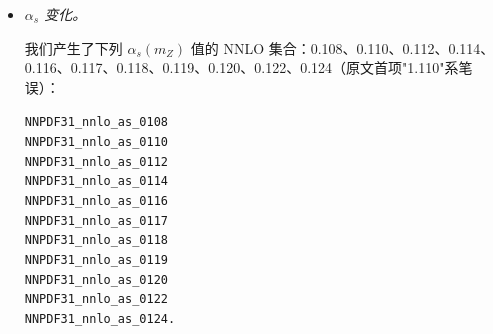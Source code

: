 \begin{itemize}
我们产生了 NLO 与 NNLO 的集合，其最大味数不同于默认的 5：或扩展至六，或冻结在四：
\begin{flushleft}
  \tt NNPDF31\_nlo\_as\_0118\_nf\_4 \\
  \tt NNPDF31\_nlo\_as\_0118\_nf\_6 \\
  \tt NNPDF31\_nnlo\_as\_0118\_nf\_4 \\
  \tt NNPDF31\_nnlo\_as\_0118\_nf\_6. \\
\end{flushleft}
微扰生成粲变体同样可用，此时还有 $n_f=3$ 固定味数方案：
\begin{flushleft}
  \tt NNPDF31\_nlo\_pch\_as\_0118\_nf\_3 \\
  \tt NNPDF31\_nlo\_pch\_as\_0118\_nf\_4 \\
  \tt NNPDF31\_nlo\_pch\_as\_0118\_nf\_6 \\
  \tt NNPDF31\_nnlo\_pch\_as\_0118\_nf\_3 \\
  \tt NNPDF31\_nnlo\_pch\_as\_0118\_nf\_4 \\
  \tt NNPDF31\_nnlo\_pch\_as\_0118\_nf\_6. \\
\end{flushleft}




\item {\it $\alpha_s$ 变化。}

我们产生了下列 $\alpha_s(m_Z)$ 值的 NNLO 集合：0.108、0.110、0.112、0.114、0.116、0.117、0.118、0.119、0.120、0.122、0.124（原文首项"1.110"系笔误）：
\begin{flushleft}
  \tt NNPDF31\_nnlo\_as\_0108 \\
  \tt NNPDF31\_nnlo\_as\_0110 \\
  \tt NNPDF31\_nnlo\_as\_0112 \\
  \tt NNPDF31\_nnlo\_as\_0114 \\
  \tt NNPDF31\_nnlo\_as\_0116 \\
  \tt NNPDF31\_nnlo\_as\_0117 \\
  \tt NNPDF31\_nnlo\_as\_0118 \\
  \tt NNPDF31\_nnlo\_as\_0119 \\
  \tt NNPDF31\_nnlo\_as\_0120 \\
  \tt NNPDF31\_nnlo\_as\_0122 \\
  \tt NNPDF31\_nnlo\_as\_0124. \\
\end{flushleft}


\end{itemize}
